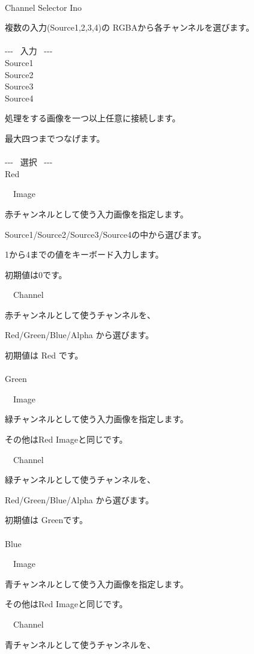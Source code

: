 \documentclass[a4paper,12pt]{article}
\begin{document}
\thispagestyle{empty}

\Large
\noindent \\
Channel Selector Ino\medskip
\par
\normalsize
複数の入力(Source1,2,3,4)の RGBAから各チャンネルを選びます。\\
\\
-{-}- \ 入力 \ -{-}-\\
Source1\\
Source2\\
Source3\\
Source4\par
処理をする画像を一つ以上任意に接続します。\par
最大四つまでつなげます。\\
\\
-{-}- \ 選択 \ -{-}-\\
Red\par
\noindent \ \, Image\par
赤チャンネルとして使う入力画像を指定します。\par
Source1/Source2/Source3/Source4の中から選びます。\par
1から4までの値をキーボード入力します。\par
初期値は0です。\\
\par
\noindent \ \, Channel\par
赤チャンネルとして使うチャンネルを、\par
Red/Green/Blue/Alpha から選びます。\par
初期値は Red です。\\
\\
Green\par
\noindent \ \, Image\par
緑チャンネルとして使う入力画像を指定します。\par
その他は\textquotedbl Red Image\textquotedbl と同じです。\\
\par
\noindent \ \, Channel\par
緑チャンネルとして使うチャンネルを、\par
Red/Green/Blue/Alpha から選びます。\par
初期値は Greenです。\\
\\
Blue\par
\noindent \ \, Image\par
青チャンネルとして使う入力画像を指定します。\par
その他は\textquotedbl Red Image\textquotedbl と同じです。\\
\par
\noindent \ \, Channel\par
青チャンネルとして使うチャンネルを、
\end{document}
